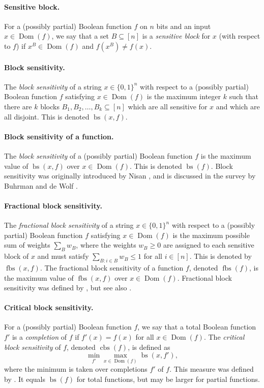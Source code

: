 \documentclass[10pt,a4paper]{article}
\theoremstyle{definition}
\DeclareMathOperator{\Dom}{Dom}
\newcommand{\B}{\{0,1\}}
\renewcommand{\>}{\rangle}
\newcommand{\<}{\langle}
\DeclareMathOperator{\bs}{bs}
\DeclareMathOperator{\fbs}{fbs}
\DeclareMathOperator{\cbs}{cbs}
\begin{document}
\paragraph{Sensitive block.} For a (possibly partial) Boolean
function $f$ on $n$ bits and an input $x\in\Dom(f)$, we say that
a set $B\subseteq[n]$ is a \emph{sensitive block} for $x$
(with respect to $f$) if $x^B\in\Dom(f)$ and $f(x^B)\ne f(x)$.

\paragraph{Block sensitivity.} The \emph{block sensitivity}
of a string $x\in\B^n$ with respect to a (possibly partial)
Boolean function $f$ satisfying $x\in\Dom(f)$ is the maximum
integer $k$ such that there are $k$ blocks
$B_1,B_2,\dots,B_k\subseteq[n]$ which are all sensitive
for $x$ and which are all disjoint. This is denoted
$\bs(x,f)$.

\paragraph{Block sensitivity of a function.} The
\emph{block sensitivity} of a (possibly partial) Boolean function
$f$ is the maximum value of $\bs(x,f)$ over $x\in\Dom(f)$.
This is denoted $\bs(f)$.
Block sensitivity was originally introduced by Nisan
\cite{Nis91}, and is discussed in the survey by Buhrman and
de Wolf \cite{BdW02}.

\paragraph{Fractional block sensitivity.} The
\emph{fractional block sensitivity} of a string $x\in\B^n$
with respect to a (possibly partial) Boolean function $f$
satisfying $x\in\Dom(f)$ is the maximum possible
sum of weights $\sum_B w_B$, where the weights $w_B\ge 0$
are assigned to each sensitive block of $x$ and must satisfy
$\sum_{B:i\in B} w_B\le 1$ for all $i\in[n]$.
This is denoted by $\fbs(x,f)$. The fractional block sensitivity
of a function $f$, denoted $\fbs(f)$, is the maximum value of
$\fbs(x,f)$ over $x\in\Dom(f)$.
Fractional block sensitivity was defined by \cite{Aar08},
but see also \cite{KT16}.

\paragraph{Critical block sensitivity.}
For a (possibly partial) Boolean function $f$, we say that
a total Boolean function $f'$ is a \emph{completion} of $f$
if $f'(x)=f(x)$ for all $x\in\Dom(f)$. The \emph{critical block
sensitivity} of $f$, denoted $\cbs(f)$, is defined as
\[\min_{f'}\max_{x\in\Dom(f)}\bs(x,f'),\]
where the minimum is taken over completions $f'$ of $f$.
This measure was defined by \cite{HN12}. It equals $\bs(f)$
for total functions, but may be larger for partial functions.
\end{document}
